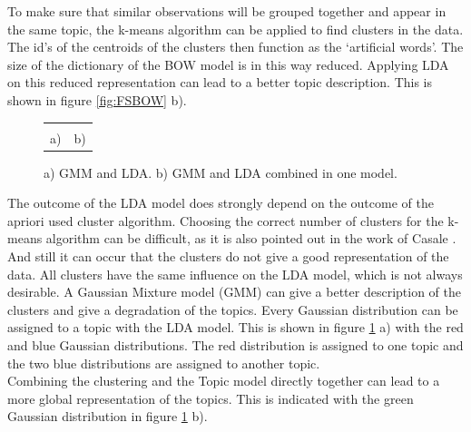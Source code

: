 To make sure that similar observations will be grouped together and appear in the same topic, the k-means algorithm can be applied to find clusters in the data. The id's of the centroids of the clusters then function as the `artificial words'. The size of the dictionary of the BOW model is in this way reduced. Applying LDA on this reduced representation can lead to a better topic description. This is shown in figure \ref{fig:FSBOW} b).\\

\begin{figure}[h]
\centering
\begin{tabular}{c c} 
\def\svgwidth{0.45\textwidth}  & \def\svgwidth{0.45\textwidth} \\
a) & b)
\end{tabular}
\caption{a) GMM and LDA. b) GMM and LDA combined in one model.}
\label{fig:GMM+LDA}
\end{figure}

The outcome of the LDA model does strongly depend on the outcome of the apriori used cluster algorithm. Choosing the correct number of clusters for the k-means algorithm can be difficult, as it is also pointed out in the work of Casale \cite{Casale:2009}. And still it can occur that the clusters do not give a good representation of the data. All clusters have the same influence on the LDA model, which is not always desirable. A Gaussian Mixture model (GMM) can give a better description of the clusters and give a degradation of the topics. Every Gaussian distribution can be assigned to a topic with the LDA model. This is shown in figure \ref{fig:GMM+LDA} a) with the red and blue Gaussian distributions. The red distribution is assigned to one topic and the two blue distributions are assigned to another topic.\\

Combining the clustering and the Topic model directly together can lead to a more global representation of the topics. This is indicated with the green Gaussian distribution in figure \ref{fig:GMM+LDA} b). 



 


